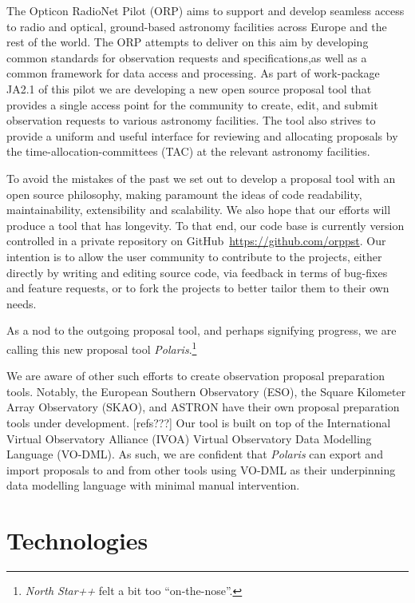 \documentclass[11pt,twoside]{article}
\begin{document}
The Opticon RadioNet Pilot (ORP) aims to support and develop seamless access to radio and optical,
ground-based astronomy facilities across Europe and the rest of the world.
The ORP attempts to deliver on this aim by developing common standards for observation requests and
specifications,as well as a common framework for data access and processing.
As part of work-package JA2.1 of this pilot we are developing a new open source proposal tool that provides
a single access point for the community to create, edit, and submit observation requests to various astronomy
facilities.
The tool also strives to provide a uniform and useful interface for reviewing and allocating proposals by the
time-allocation-committees (TAC) at the relevant astronomy facilities.

To avoid the mistakes of the past we set out to develop a proposal tool with an open source philosophy, making
paramount the ideas of code readability, maintainability, extensibility and scalability.
We also hope that our efforts will produce a tool that has longevity.
To that end, our code base is currently version controlled in a private repository on
GitHub~\url{https://github.com/orppst}.
Our intention is to allow the user community to contribute to the projects, either directly by writing and
editing source code, via feedback in terms of bug-fixes and feature requests, or to fork the projects to
better tailor them to their own needs.

As a nod to the outgoing proposal tool, and perhaps signifying progress, we are calling this new proposal tool
\emph{Polaris}.\footnote{\emph{North Star++} felt a bit too ``on-the-nose''.}

We are aware of other such efforts to create observation proposal preparation tools.
Notably, the European Southern Observatory (ESO), the Square Kilometer Array Observatory (SKAO), and ASTRON
have their own proposal preparation tools under development. [refs???]
Our tool is built on top of the International Virtual Observatory Alliance (IVOA) Virtual
Observatory Data Modelling Language (VO-DML).
As such, we are confident that \emph{Polaris} can export and import proposals to and from other tools using
VO-DML as their underpinning data modelling language with minimal manual intervention.


\section{Technologies}\label{sec:technologies}
\end{document}
